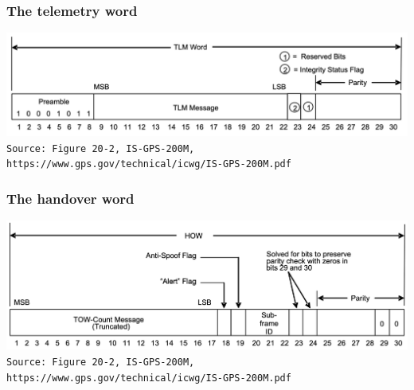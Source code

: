 \documentclass[aspectratio=169, xcolor=table]{beamer}
\begin{document}
\begin{frame}
    \frametitle{The telemetry word}

    \centering
    \includegraphics[width=\textwidth]{8 tlm word.png} \\
    \texttt{\tiny{Source: Figure 20-2, IS-GPS-200M, https://www.gps.gov/technical/icwg/IS-GPS-200M.pdf}}
\end{frame}

\begin{frame}
    \frametitle{The handover word}

    \centering
    \includegraphics[width=\textwidth]{10 handover word.png} \\
    \texttt{\tiny{Source: Figure 20-2, IS-GPS-200M, https://www.gps.gov/technical/icwg/IS-GPS-200M.pdf}}
\end{frame}
\end{document}
